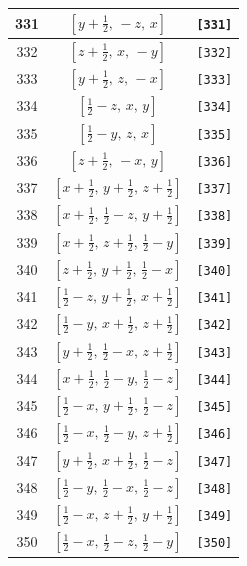 \documentclass[fleqn,8pt]{jsarticle}
\begin{document}
\begin{longtable}{ccc}
331 & $\left[ y + \frac{1}{2},\, - z,\, x \right]$ & {\tt [331]} \\ \hline
332 & $\left[ z + \frac{1}{2},\, x,\, - y \right]$ & {\tt [332]} \\ \hline
333 & $\left[ y + \frac{1}{2},\, z,\, - x \right]$ & {\tt [333]} \\ \hline
334 & $\left[ \frac{1}{2} - z,\, x,\, y \right]$ & {\tt [334]} \\ \hline
335 & $\left[ \frac{1}{2} - y,\, z,\, x \right]$ & {\tt [335]} \\ \hline
336 & $\left[ z + \frac{1}{2},\, - x,\, y \right]$ & {\tt [336]} \\ \hline
337 & $\left[ x + \frac{1}{2},\, y + \frac{1}{2},\, z + \frac{1}{2} \right]$ & {\tt [337]} \\ \hline
338 & $\left[ x + \frac{1}{2},\, \frac{1}{2} - z,\, y + \frac{1}{2} \right]$ & {\tt [338]} \\ \hline
339 & $\left[ x + \frac{1}{2},\, z + \frac{1}{2},\, \frac{1}{2} - y \right]$ & {\tt [339]} \\ \hline
340 & $\left[ z + \frac{1}{2},\, y + \frac{1}{2},\, \frac{1}{2} - x \right]$ & {\tt [340]} \\ \hline
341 & $\left[ \frac{1}{2} - z,\, y + \frac{1}{2},\, x + \frac{1}{2} \right]$ & {\tt [341]} \\ \hline
342 & $\left[ \frac{1}{2} - y,\, x + \frac{1}{2},\, z + \frac{1}{2} \right]$ & {\tt [342]} \\ \hline
343 & $\left[ y + \frac{1}{2},\, \frac{1}{2} - x,\, z + \frac{1}{2} \right]$ & {\tt [343]} \\ \hline
344 & $\left[ x + \frac{1}{2},\, \frac{1}{2} - y,\, \frac{1}{2} - z \right]$ & {\tt [344]} \\ \hline
345 & $\left[ \frac{1}{2} - x,\, y + \frac{1}{2},\, \frac{1}{2} - z \right]$ & {\tt [345]} \\ \hline
346 & $\left[ \frac{1}{2} - x,\, \frac{1}{2} - y,\, z + \frac{1}{2} \right]$ & {\tt [346]} \\ \hline
347 & $\left[ y + \frac{1}{2},\, x + \frac{1}{2},\, \frac{1}{2} - z \right]$ & {\tt [347]} \\ \hline
348 & $\left[ \frac{1}{2} - y,\, \frac{1}{2} - x,\, \frac{1}{2} - z \right]$ & {\tt [348]} \\ \hline
349 & $\left[ \frac{1}{2} - x,\, z + \frac{1}{2},\, y + \frac{1}{2} \right]$ & {\tt [349]} \\ \hline
350 & $\left[ \frac{1}{2} - x,\, \frac{1}{2} - z,\, \frac{1}{2} - y \right]$ & {\tt [350]} \\ \hline

\end{longtable}
\end{document}
